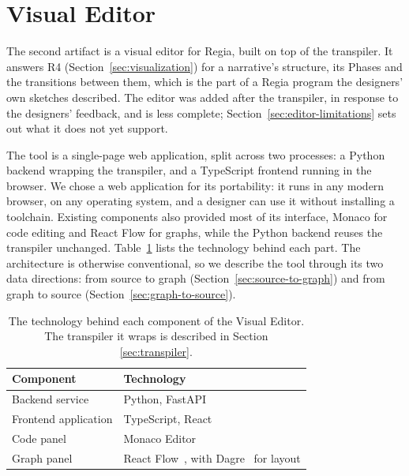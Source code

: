  
\section{Visual Editor}
\label{sec:editor}
 
The second artifact is a visual editor for Regia, built on top of the transpiler. It answers R4 (Section~\ref{sec:visualization}) for a narrative's structure, its Phases and the transitions between them, which is the part of a Regia program the designers' own sketches described. The editor was added after the transpiler, in response to the designers' feedback, and is less complete; Section~\ref{sec:editor-limitations} sets out what it does not yet support.
 
The tool is a single-page web application, split across two processes: a Python backend wrapping the transpiler, and a TypeScript frontend running in the browser. We chose a web application for its portability: it runs in any modern browser, on any operating system, and a designer can use it without installing a toolchain. Existing components also provided most of its interface, Monaco for code editing and React Flow for graphs, while the Python backend reuses the transpiler unchanged. Table~\ref{tab:editor-stack} lists the technology behind each part. The architecture is otherwise conventional, so we describe the tool through its two data directions: from source to graph (Section~\ref{sec:source-to-graph}) and from graph to source (Section~\ref{sec:graph-to-source}).
 
\begin{table}[h]
\centering
\begin{tabular}{|l|l|}
\hline
\textbf{Component} & \textbf{Technology} \\
\hline
Backend service & Python, FastAPI~\cite{FastAPI} \\
Frontend application & TypeScript, React~\cite{React} \\
Code panel & Monaco Editor~\cite{Monaco} \\
Graph panel & React Flow~\cite{ReactFlow}, with Dagre~\cite{Dagre} for layout \\
\hline
\end{tabular}
\caption{The technology behind each component of the Visual Editor. The transpiler it wraps is described in Section \ref{sec:transpiler}.}
\label{tab:editor-stack}
\end{table}
 
